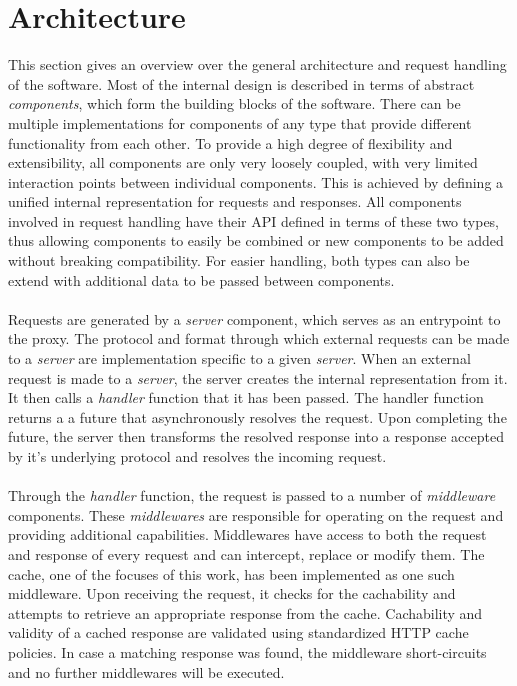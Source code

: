 \chapter{Architecture}
\label{architecture}

This section gives an overview over the general architecture and request handling of the software. Most of the internal design is described in terms of abstract \textit{components}, which form the building blocks of the software. There can be multiple implementations for components of any type that provide different functionality from each other.
To provide a high degree of flexibility and extensibility, all components are only very loosely coupled, with very limited interaction points between individual components. This is achieved by defining a unified internal representation for requests and responses. All components involved in request handling have their API defined in terms of these two types, thus allowing components to easily be combined or new components to be added without breaking compatibility. For easier handling, both types can also be extend with additional data to be passed between components.
\\\\
Requests are generated by a \textit{server} component, which serves as an entrypoint to the proxy. The protocol and format through which external requests can be made to a \textit{server} are implementation specific to a given \textit{server}. When an external request is made to a \textit{server}, the server creates the internal representation from it. It then calls a \textit{handler} function that it has been passed. The handler function returns a a future that asynchronously resolves the request. Upon completing the future, the server then transforms the resolved response into a response accepted by it's underlying protocol and resolves the incoming request.
\\\\
Through the \textit{handler} function, the request is passed to a number of \textit{middleware} components. These \textit{middlewares} are responsible for operating on the request and providing additional capabilities.
Middlewares have access to both the request and response of every request and can intercept, replace or modify them.
The cache, one of the focuses of this work, has been implemented as one such middleware. Upon receiving the request, it checks for the cachability and attempts to retrieve an appropriate response from the cache. Cachability and validity of a cached response are validated using standardized HTTP cache policies. In case a matching response was found, the middleware short-circuits and no further middlewares will be executed. 
